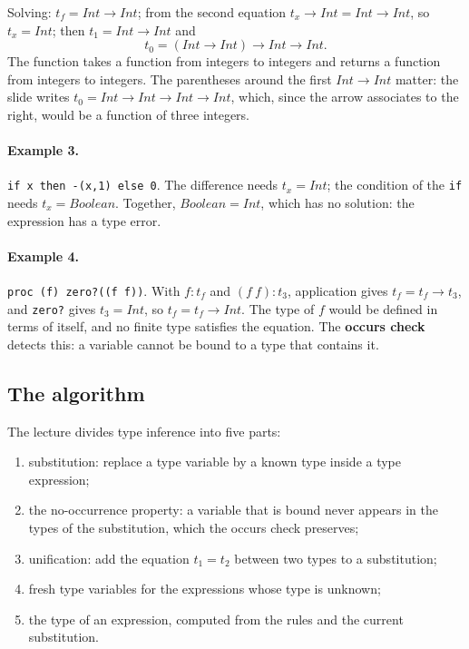 Solving: $t_f = \mathit{Int} \to \mathit{Int}$; from the second equation
$t_x \to \mathit{Int} = \mathit{Int} \to \mathit{Int}$, so $t_x = \mathit{Int}$; then
$t_1 = \mathit{Int} \to \mathit{Int}$ and
\[
t_0 = (\mathit{Int} \to \mathit{Int}) \to \mathit{Int} \to \mathit{Int}.
\]
The function takes a function from integers to integers and returns a
function from integers to integers. The parentheses around the first
$\mathit{Int} \to \mathit{Int}$ matter: the slide writes
$t_0 = \mathit{Int} \to \mathit{Int} \to \mathit{Int} \to \mathit{Int}$, which, since the
arrow associates to the right, would be a function of three integers.

\paragraph{Example 3.} \texttt{if x then -(x,1) else 0}. The difference needs
$t_x = \mathit{Int}$; the condition of the \texttt{if} needs
$t_x = \mathit{Boolean}$. Together, $\mathit{Boolean} = \mathit{Int}$, which has no
solution: the expression has a type error.

\paragraph{Example 4.} \texttt{proc (f) zero?((f f))}. With $f : t_f$ and
$(f\ f) : t_3$, application gives $t_f = t_f \to t_3$, and \texttt{zero?} gives
$t_3 = \mathit{Int}$, so $t_f = t_f \to \mathit{Int}$. The type of $f$ would be defined
in terms of itself, and no finite type satisfies the equation. The
\textbf{occurs check} detects this: a variable cannot be bound to a type that
contains it.

\subsection{The algorithm}

The lecture divides type inference into five parts:
\begin{enumerate}
  \item substitution: replace a type variable by a known type inside a type
    expression;
  \item the no-occurrence property: a variable that is bound never appears
    in the types of the substitution, which the occurs check preserves;
  \item unification: add the equation $t_1 = t_2$ between two types to a
    substitution;
  \item fresh type variables for the expressions whose type is unknown;
  \item the type of an expression, computed from the rules and the current
    substitution.
\end{enumerate}

